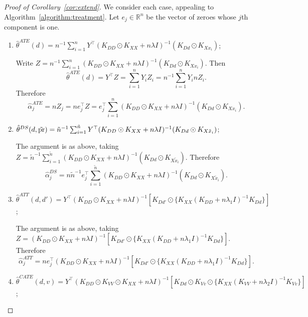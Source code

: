 \begin{proof}[Proof of Corollary~\ref{cor:extend}]
We consider each case, appealing to Algorithm~\ref{algorithm:treatment}. Let $e_j\in \mathbb{R}^n$ be the vector of zeroes whose $j$th component is one. 
\begin{enumerate}
    \item $\hat{\theta}^{ATE}(d)=n^{-1}\sum_{i=1}^n Y^{\top}(K_{DD}\odot K_{XX}+n\lambda  I )^{-1}(K_{Dd}\odot K_{Xx_i})  $;
 
    Write $Z=n^{-1}\sum_{i=1}^n(K_{DD}\odot K_{XX}+n\lambda  I )^{-1}(K_{Dd}\odot K_{Xx_{i}})$. Then
    $$
    \hat{\theta}^{ATE}(d)=Y^{\top}Z=\sum_{i=1}^n Y_iZ_i=n^{-1}\sum_{i=1}^n Y_i nZ_i.
    $$
    Therefore
    $$
    \hat{\alpha}_j^{ATE}=nZ_j=ne_j^{\top} Z=e_j^{\top}\sum_{i=1}^n(K_{DD}\odot K_{XX}+n\lambda  I )^{-1}(K_{Dd}\odot K_{Xx_{i}}).
    $$
    
    
     \item $\hat{\theta}^{DS}(d,\tilde{\text{\normalfont pr}})=\tilde{n}^{-1}\sum_{i=1}^{\tilde{n}} Y^{\top}(K_{DD}\odot K_{XX}+n\lambda  I )^{-1}(K_{Dd}\odot K_{X\tilde{x}_i}) $;
     
     The argument is as above, taking $Z=\tilde{n}^{-1}\sum_{i=1}^{\tilde{n}}(K_{DD}\odot K_{XX}+n\lambda  I )^{-1}(K_{Dd}\odot K_{X\tilde{x}_i}) $. Therefore
     $$
     \hat{\alpha}_j^{DS}=n\tilde{n}^{-1}e_j^{\top}\sum_{i=1}^{\tilde{n}}(K_{DD}\odot K_{XX}+n\lambda  I )^{-1}(K_{Dd}\odot K_{X\tilde{x}_i}).
     $$
     
    \item $\hat{\theta}^{ATT}(d,d')=Y^{\top}(K_{DD}\odot K_{XX}+n\lambda  I )^{-1}[K_{Dd'}\odot \{K_{XX}(K_{DD}+n\lambda_1  I )^{-1}K_{Dd}\}]$;
    
    The argument is as above, taking $Z=(K_{DD}\odot K_{XX}+n\lambda  I )^{-1}[K_{Dd'}\odot \{K_{XX}(K_{DD}+n\lambda_1  I )^{-1}K_{Dd}\}]$. Therefore
     $$
     \hat{\alpha}_j^{ATT}=ne_j^{\top}(K_{DD}\odot K_{XX}+n\lambda  I )^{-1}[K_{Dd'}\odot \{K_{XX}(K_{DD}+n\lambda_1  I )^{-1}K_{Dd}\}].
     $$
     
    \item $\hat{\theta}^{CATE}(d,v)=Y^{\top}(K_{DD}\odot K_{VV}\odot K_{XX} +n\lambda  I )^{-1}[K_{Dd}\odot K_{Vv}\odot \{K_{XX}(K_{VV}+n\lambda_2  I )^{-1}K_{Vv} \}] $;
    

\end{enumerate}
\end{proof}

